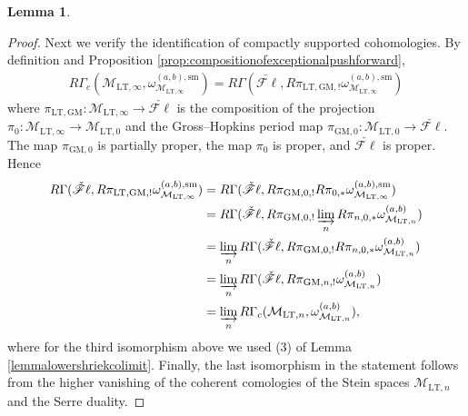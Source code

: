 \documentclass{article}
\theoremstyle{definition}
\newtheorem{lemma}[theorem]{Lemma}
\def\calM{\mathcal{M}}
\newcommand{\dlim}{\varinjlim}
\def\LT{\mathrm{LT}}
\def\sm{\mathrm{sm}}
\def\fl{\mathscr{F}\ell}
\def\GM{\mathrm{GM}}
\begin{document}
\begin{lemma}
\begin{proof}
Next we verify the identification of compactly supported cohomologies. By definition and Proposition \ref{prop:compositionofexceptionalpushforward}, 
\begin{align*}
    R\Gamma_c(\calM_{\LT,\infty},\omega_{\calM_{\LT,\infty}}^{(a,b),\sm})=R\Gamma(\check{\fl},R\pi_{\LT,\GM,!}\omega_{\calM_{\LT,\infty}}^{(a,b),\sm})
\end{align*}
where $\pi_{\LT,\GM}:\calM_{\LT,\infty}\to \check{\fl}$ is the composition of the projection $\pi_{0}:\calM_{\LT,\infty}\to \calM_{\LT,0}$ and the Gross--Hopkins period map $\pi_{\GM,0}:\calM_{\LT,0}\to \check{\fl}$. The map $\pi_{\GM,0}$ is partially proper, the map $\pi_{0}$ is proper, and $\check{\fl}$ is proper. Hence
\begin{align*}
    R\Gamma(\check{\fl},R\pi_{\LT,\GM,!}\omega_{\calM_{\LT,\infty}}^{(a,b),\sm})&=R\Gamma(\check{\fl},R\pi_{\GM,0,!}R\pi_{0,*}\omega_{\calM_{\LT,\infty}}^{(a,b),\sm})\\
    &=R\Gamma(\check{\fl},R\pi_{\GM,0,!}\dlim_n R\pi_{n,0,*}\omega_{\calM_{\LT,n}}^{(a,b)})\\
    &=\dlim_n R\Gamma(\check{\fl},R\pi_{\GM,0,!} R\pi_{n,0,*}\omega_{\calM_{\LT,n}}^{(a,b)})\\
    &=\dlim_n R\Gamma(\check{\fl},R\pi_{\GM,n,!} \omega_{\calM_{\LT,n}}^{(a,b)})\\
    &=\dlim_n R\Gamma_c(\calM_{\LT,n},\omega_{\calM_{\LT,n}}^{(a,b)}),
\end{align*}
where for the third isomorphism above we used (3) of Lemma \ref{lemmalowershriekcolimit}. Finally, the last isomorphism in the statement follows from the higher vanishing of the coherent comologies of the Stein spaces $\calM_{\LT,n}$ and the Serre duality.
\end{proof}
\end{lemma}
\end{document}
